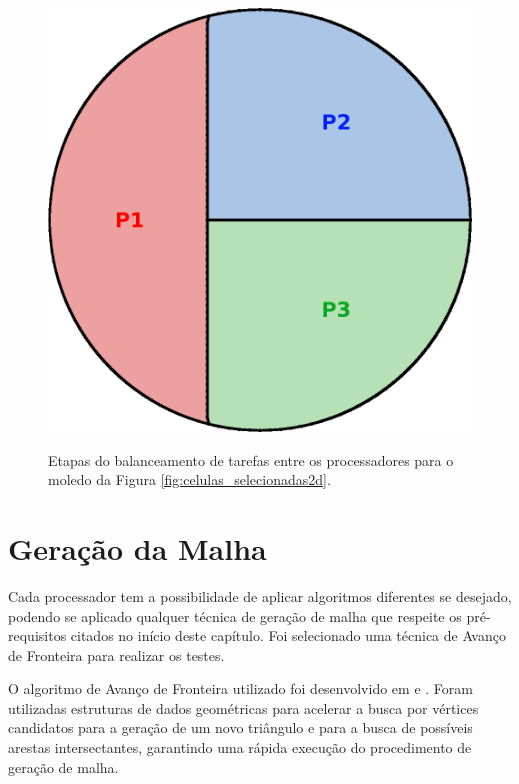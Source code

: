 \begin{figure}[!ht]
{		\begin{minipage}[c]{0.3\textwidth}{\includegraphics[width=\textwidth]{fig/balanceamento2.png}}\end{minipage}
	}
	\caption{Etapas do balanceamento de tarefas entre os processadores para o moledo da Figura \ref{fig:celulas_selecionadas2d}.}
	\label{fig:balanceamento_esfera}
\end{figure}


\section{Geração da Malha}
\label{sec:Geracao_da_Malha}

Cada processador tem a possibilidade de aplicar algoritmos diferentes se desejado, podendo se aplicado qualquer técnica de geração de malha que respeite os pré-requisitos citados no início deste capítulo. Foi selecionado uma técnica de Avanço de Fronteira para realizar os testes.

O algoritmo de Avanço de Fronteira utilizado foi desenvolvido em \cite{bib:Miranda99} e \cite{bib:Cavalcante-Neto01}. Foram utilizadas estruturas de dados geométricas para acelerar a busca por vértices candidatos para a geração de um novo triângulo e para a busca de possíveis arestas intersectantes, garantindo uma rápida execução do procedimento de geração de malha.


